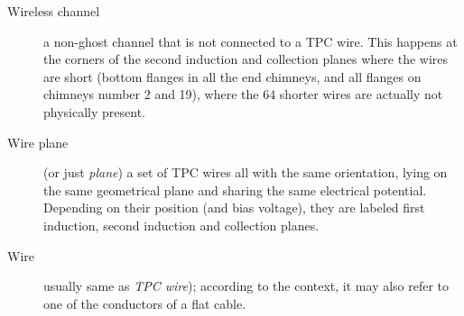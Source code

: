 \begin{description}
  \item[Wireless channel]
    a non-ghost channel that is not connected to a TPC wire.
    This happens at the corners of the second induction and collection planes
    where the wires are short (bottom flanges in all the end chimneys, and all
    flanges on chimneys number 2 and 19), where the 64 shorter wires are
    actually not physically present.
  
  \item[Wire plane]
    (or just \emph{plane}) a set of TPC wires all with the same
    orientation, lying on the same geometrical plane and sharing the same
    electrical potential.
    Depending on their position (and bias voltage), they are labeled first
    induction, second induction and collection planes.

  \item[Wire]
    usually same as \emph{TPC wire}); according to the context,
    it may also refer to one of the conductors of a flat cable.

\end{description}
